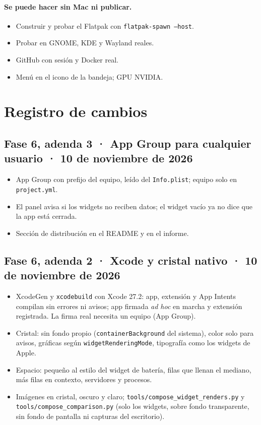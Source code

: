 \documentclass[11pt,a4paper]{article}
\begin{document}
\paragraph{Se puede hacer sin Mac ni publicar.}
\begin{itemize}
  \item[$\square$] Construir y probar el Flatpak con
    \texttt{flatpak-spawn --host}.
  \item[$\square$] Probar en GNOME, KDE y Wayland reales.
  \item[$\square$] GitHub con sesión y Docker real.
  \item[$\square$] Menú en el icono de la bandeja; GPU NVIDIA.
\end{itemize}

\section{Registro de cambios}
\subsection*{Fase 6, adenda 3 · App Group para cualquier usuario · 10 de noviembre de 2026}
\begin{itemize}
  \item App Group con prefijo del equipo, leído del
    \texttt{Info.plist}; equipo solo en \texttt{project.yml}.
  \item El panel avisa si los widgets no reciben datos; el widget
    vacío ya no dice que la app está cerrada.
  \item Sección de distribución en el README y en el informe.
\end{itemize}

\subsection*{Fase 6, adenda 2 · Xcode y cristal nativo · 10 de noviembre de 2026}
\begin{itemize}
  \item XcodeGen y \texttt{xcodebuild} con Xcode 27.2: app, extensión
    y App Intents compilan sin errores ni avisos; app firmada \emph{ad
    hoc} en marcha y extensión registrada. La firma real necesita un
    equipo (App Group).
  \item Cristal: sin fondo propio (\texttt{containerBackground} del
    sistema), color solo para avisos, gráficas según
    \texttt{widgetRenderingMode}, tipografía como los widgets de Apple.
  \item Espacio: pequeño al estilo del widget de batería, filas que
    llenan el mediano, más filas en contexto, servidores y procesos.
  \item Imágenes en cristal, oscuro y claro;
    \texttt{tools/compose\_widget\_renders.py} y
    \texttt{tools/compose\_comparison.py} (solo los widgets, sobre
    fondo transparente, sin fondo de pantalla ni capturas del
    escritorio).
\end{itemize}
\end{document}
